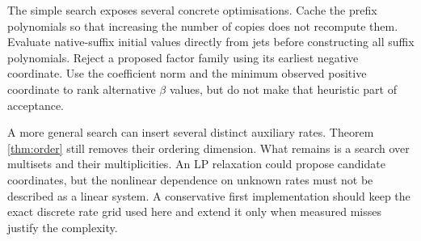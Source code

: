 The simple search exposes several concrete optimisations. Cache the prefix
polynomials so that increasing the number of copies does not recompute them.
Evaluate native-suffix initial values directly from jets before constructing
all suffix polynomials. Reject a proposed factor family using its earliest
negative coordinate. Use the coefficient norm and the minimum observed
positive coordinate to rank alternative $\beta$ values, but do not make that
heuristic part of acceptance.

A more general search can insert several distinct auxiliary rates. Theorem
\ref{thm:order} still removes their ordering dimension. What remains is a search
over multisets and their multiplicities. An LP relaxation could propose
candidate coordinates, but the nonlinear dependence on unknown rates must not
be described as a linear system. A conservative first implementation should
keep the exact discrete rate grid used here and extend it only when measured
misses justify the complexity.
